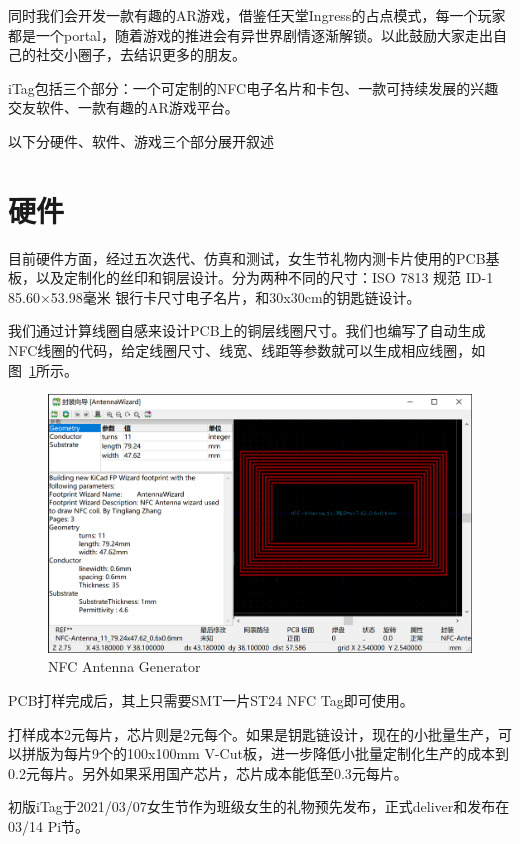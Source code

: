 \documentclass[UTF8]{ctexart}
\begin{document}
同时我们会开发一款有趣的AR游戏，借鉴任天堂Ingress的占点模式，每一个玩家都是一个portal，随着游戏的推进会有异世界剧情逐渐解锁。以此鼓励大家走出自己的社交小圈子，去结识更多的朋友。

iTag包括三个部分：一个可定制的NFC电子名片和卡包、一款可持续发展的兴趣交友软件、一款有趣的AR游戏平台。

以下分硬件、软件、游戏三个部分展开叙述

\section{硬件}

目前硬件方面，经过五次迭代、仿真和测试，女生节礼物内测卡片使用的PCB基板，以及定制化的丝印和铜层设计。分为两种不同的尺寸：ISO 7813 规范 ID-1 85.60×53.98毫米 银行卡尺寸电子名片，和30x30cm的钥匙链设计。

我们通过计算线圈自感来设计PCB上的铜层线圈尺寸。我们也编写了自动生成NFC线圈的代码，给定线圈尺寸、线宽、线距等参数就可以生成相应线圈，如图~\ref{NFCAntennaGenerator}所示。

\begin{figure}[htbp]
    \centering
    \includegraphics[width=\linewidth]{NFCAntennaGenerator.png}
    \caption{NFC Antenna Generator} 
    \label{NFCAntennaGenerator}
\end{figure}

PCB打样完成后，其上只需要SMT一片ST24 NFC Tag即可使用。

打样成本2元每片，芯片则是2元每个。如果是钥匙链设计，现在的小批量生产，可以拼版为每片9个的100x100mm V-Cut板，进一步降低小批量定制化生产的成本到0.2元每片。另外如果采用国产芯片，芯片成本能低至0.3元每片。

初版iTag于2021/03/07女生节作为班级女生的礼物预先发布，正式deliver和发布在03/14 Pi节。
\end{document}

